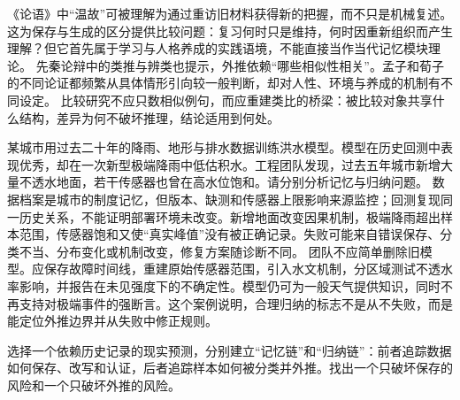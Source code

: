 《论语》中“温故”可被理解为通过重访旧材料获得新的把握，而不只是机械复述。\parencite{analects2003} 这为保存与生成的区分提供比较问题：复习何时只是维持，何时因重新组织而产生理解？但它首先属于学习与人格养成的实践语境，不能直接当作当代记忆模块理论。 先秦论辩中的类推与辨类也提示，外推依赖“哪些相似性相关”。孟子和荀子的不同论证都频繁从具体情形引向较一般判断，却对人性、环境与养成的机制有不同设定。\parencite{mencius2008,xunzi2014} 比较研究不应只数相似例句，而应重建类比的桥梁：被比较对象共享什么结构，差异为何不破坏推理，结论适用到何处。

某城市用过去二十年的降雨、地形与排水数据训练洪水模型。模型在历史回测中表现优秀，却在一次新型极端降雨中低估积水。工程团队发现，过去五年城市新增大量不透水地面，若干传感器也曾在高水位饱和。请分别分析记忆与归纳问题。 数据档案是城市的制度记忆，但版本、缺测和传感器上限影响来源监控；回测复现同一历史关系，不能证明部署环境未改变。新增地面改变因果机制，极端降雨超出样本范围，传感器饱和又使“真实峰值”没有被正确记录。失败可能来自错误保存、分类不当、分布变化或机制改变，修复方案随诊断不同。 团队不应简单删除旧模型。应保存故障时间线，重建原始传感器范围，引入水文机制，分区域测试不透水率影响，并报告在未见强度下的不确定性。模型仍可为一般天气提供知识，同时不再支持对极端事件的强断言。这个案例说明，合理归纳的标志不是从不失败，而是能定位外推边界并从失败中修正规则。

\begin{tcolorbox}[breakable,colback=white,colframe=blue!30!black,title={专题研读任务},fonttitle=\bfseries]
选择一个依赖历史记录的现实预测，分别建立“记忆链”和“归纳链”：前者追踪数据如何保存、改写和认证，后者追踪样本如何被分类并外推。找出一个只破坏保存的风险和一个只破坏外推的风险。
\end{tcolorbox}


